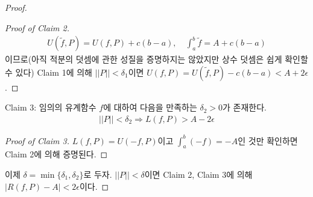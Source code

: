 \documentclass[12pt]{article}
\theoremstyle{definition}
\def\eps{\epsilon}
\newcommand{\abs}[1]{\left\vert#1\right\vert}
\newcommand{\norm}[1]{\left\vert\left\vert#1\right\vert\right\vert}
\begin{document}
\begin{proof}
\begin{list}{}{\leftmargin=\parindent\rightmargin=0pt}
\begin{proof}[Proof of Claim 2]
\begin{gather*}
				U(\tilde{f}, P) = U(f, P) + c(b-a), \quad \int_a^b \tilde{f} = A + c(b-a)
			\end{gather*}
			이므로(아직 적분의 덧셈에 관한 성질을 증명하지는 않았지만 상수 덧셈은 쉽게 확인할 수 있다) Claim 1에 의해 \(\norm{P} < \delta_1\)이면 \(U(f, P) = U(\tilde{f}, P) - c(b-a) < A + 2\eps\).
		\end{proof}
	\end{list}
	Claim 3: 임의의 유계함수 \(f\)에 대하여 다음을 만족하는 \(\delta_2 > 0\)가 존재한다.
	\begin{gather*}
		\norm{P} < \delta_2 \Longrightarrow L(f, P) > A - 2\eps
	\end{gather*}
	\begin{list}{}{\leftmargin=\parindent\rightmargin=0pt}
		\item
		\begin{proof}[Proof of Claim 3]
			\(L(f, P) = U(-f, P)\)이고 \(\int_a^b (-f) = -A\)인 것만 확인하면 Claim 2에 의해 증명된다.
		\end{proof}
	\end{list}
	이제 \(\delta = \min\{\delta_1, \delta_2\}\)로 두자. \(\norm{P} < \delta\)이면 Claim 2, Claim 3에 의해 \(\abs{R(f, P) - A} < 2\eps\)이다.
\end{proof}
\end{document}

